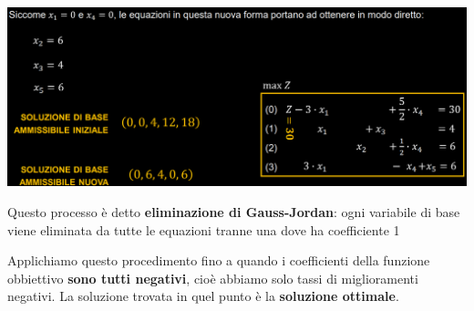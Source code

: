 \documentclass[12pt]{article}
\begin{document}
\begin{enumerate}
\begin{center}
    \end{center}
    \begin{center}
        \includegraphics[width = 1\linewidth]{Images/27.png}
    \end{center}
    Questo processo è detto \textbf{eliminazione di Gauss-Jordan}: ogni variabile di base viene eliminata da tutte le equazioni tranne una dove ha coefficiente 1
\end{enumerate}
Applichiamo questo procedimento fino a quando i coefficienti della funzione obbiettivo \textbf{sono tutti negativi}, cioè abbiamo solo tassi di miglioramenti negativi.
La soluzione trovata in quel punto è la \textbf{soluzione ottimale}.
\end{document}
